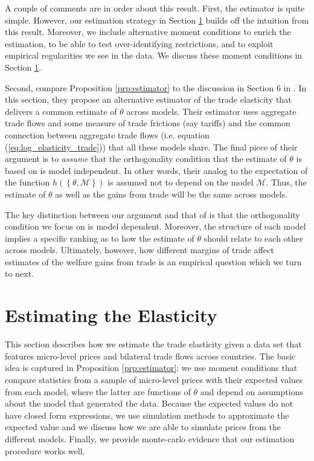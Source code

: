 \documentclass[12pt,dvips, ps2pdf]{article}
\begin{document}
A couple of comments are in order about this result. First, the estimator is quite simple. However, our estimation strategy in Section \ref{sec:estimation} builds off the intuition from this result. Moreover, we include alternative moment conditions to enrich the estimation, to be able to test over-identifying restrictions, and to exploit empirical regularities we see in the data. We discuss these moment conditions in Section \ref{sec:estimation}.

Second, compare Proposition \ref{prp:estimator} to the discussion in Section 6 in \citet{acr09}. In this section, they propose an alternative estimator of the trade elasticity that delivers a common estimate of $\theta$ across models. Their estimator uses aggregate trade flows and some measure of trade frictions (say tariffs) and the common connection between aggregate trade flows (i.e. equation (\ref{eq:log_elasticity_trade})) that all these models share. The final piece of their argument is to \emph{assume} that the orthogonality condition that the estimate of $\theta$ is based on is model independent. In other words, their analog to the expectation of the function $h(\left\{\theta,{\mathcal{M}}\right\})$ is assumed not to depend on the model $\mathcal{M}$. Thus, the estimate of $\theta$ as well as the gains from trade will be the same across models.

The key distinction between our argument and that of \citet{acr09} is that the orthogonality condition we focus on is model dependent. Moreover, the structure of each model implies a specific ranking as to how the estimate of $\theta$ should relate to each other across models. Ultimately, however, how different margins of trade affect estimates of the welfare gains from trade is an empirical question which we turn to next.

\section{Estimating the Elasticity}\label{sec:estimation}

This section describes how we estimate the trade elasticity given a data set that features micro-level prices and bilateral trade flows across countries. The basic idea is captured in Proposition \ref{prp:estimator}: we use moment conditions that compare statistics from a sample of micro-level prices with their expected values from each model, where the latter are functions of $\theta$ and depend on assumptions about the model that generated the data. Because the expected values do not have closed form expressions, we use simulation methods to approximate the expected value and we discuss how we are able to simulate prices from the different models. Finally, we provide monte-carlo evidence that our estimation procedure works well.
\end{document}
